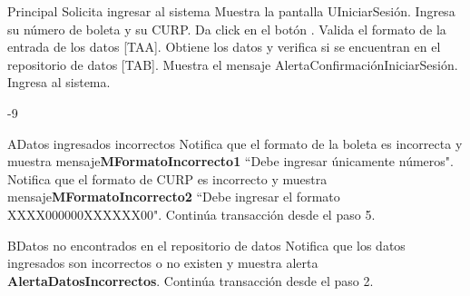 \begin{UCtrayectoria}{Principal}
  \UCpaso[\UCactor] Solicita ingresar al sistema
  \UCpaso Muestra la pantalla UIniciarSesión.
  \UCpaso[\UCactor] Ingresa su número de boleta y su CURP.
  \UCpaso[\UCactor]Da click en el botón .
  \UCpaso Valida el formato de la entrada de los datos [TAA].
  \UCpaso Obtiene los datos y verifica si se encuentran en el repositorio de datos [TAB].
  \UCpaso Muestra el mensaje AlertaConfirmaciónIniciarSesión. 
  \UCpaso[\UCactor]Ingresa al sistema.
\end{UCtrayectoria}
-9

\begin{UCtrayectoriaA}{A}{Datos ingresados incorrectos}
  \UCpaso Notifica que el formato de la boleta es incorrecta y muestra mensaje{\bf MFormatoIncorrecto1} ``Debe ingresar únicamente números".
  \UCpaso Notifica que el formato de CURP es incorrecto y muestra mensaje{\bf MFormatoIncorrecto2} ``Debe ingresar el formato XXXX000000XXXXXX00".
  \UCpaso Continúa transacción desde el paso 5.
\end{UCtrayectoriaA}

\begin{UCtrayectoriaA}{B}{Datos no encontrados en el repositorio de datos}
  \UCpaso Notifica que los datos ingresados son incorrectos o no existen y muestra alerta {\bf AlertaDatosIncorrectos}.
  \UCpaso Continúa transacción desde el paso 2.
\end{UCtrayectoriaA}
